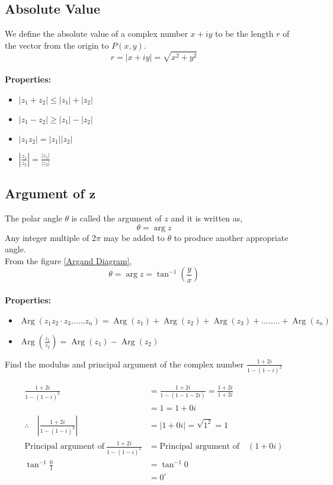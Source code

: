    \subsection{Absolute Value}
    We define the absolute value of a complex number $x+i y$ to be the length ${r}$ of the vector from the origin to $P(x, y)$. 
    $$
    r=|x+i y|=\sqrt{x^{2}+y^{2}}
    $$
    \\\textbf{Properties:}
    \begin{itemize}
    	\item $\left|z_{1}+z_{2}\right| \leq\left|z_{1}\right|+\left|z_{2}\right|$
    	\item $\left|z_{1}-z_{2}\right| \geq\left|z_{1}\right|-\left|z_{2}\right|$
    	\item $\left|z_{1} z_{2}\right|=\left|z_{1}\right|\left|z_{2}\right|$
    	\item $\left|\frac{z_{1}}{z_{2}}\right|=\frac{\left|z_{1}\right|}{\left|z_{2}\right|}$
    \end{itemize}
    \subsection{Argument of $\mathbf{z}$ }
    The polar angle $\theta$ is called the {argument} of $z$ and it is written as, $${\theta=\arg z }$$ Any integer multiple of $2 \pi$ may be added to $\theta$ to produce another appropriate  angle.\\From the figure \ref{Argand Diagram},
    $${\theta=\arg z }=\tan ^{-1}\left(\frac{y}{x}\right)$$
    \\\textbf{Properties:}
    \begin{itemize}
    	\item $\operatorname{Arg}\left(z_{1}  z_{2} \cdot z_{3} \ldots \ldots z_{n}\right)=\operatorname{Arg} \left(z_{1}\right)+\operatorname{Arg}  \left(z_{2}\right)+\operatorname{Arg}  \left(z_{3}\right)+\ldots \ldots . .+\operatorname{Arg}\left(z_{n}\right)$
    	\item $\operatorname{Arg}\left(\frac{z_{1}}{z_{2}}\right)=\operatorname{Arg}\left(z_{1}\right)-\operatorname{Arg}\left(z_{2}\right)$
    \end{itemize}
\begin{exercise}
	Find the modulus and principal argument of the complex number
	$\frac{1+2 i}{1-(1-i)^{2}}$
\end{exercise}
\begin{answer}
	\begin{align*}
	\frac{1+2 i}{1-(1-i)^{2}}&=\frac{1+2 i}{1-(1-1-2 i)}=\frac{1+2 i}{1+2 i}\\&=1=1+0 i \\
	\therefore \quad\left|\frac{1+2 i}{1-(1-i)^{2}}\right|&=|1+0 i|=\sqrt{1^{2}}=1\\
	\text{Principal argument of}\ \frac{1+2 i}{1-(1-i)^{2}}&= \text{Principal argument of} \quad \left( 1+0 i\right) \\
	\tan ^{-1} \frac{0}{1}&=\tan ^{-1} 0\\&=0^{\circ}
	\end{align*}
\end{answer}
